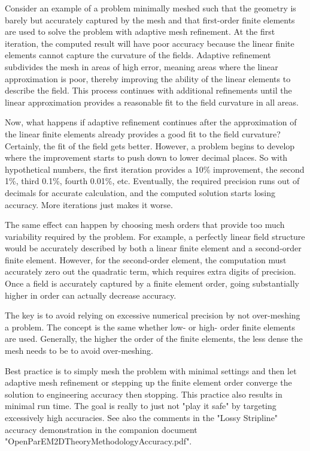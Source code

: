 \documentclass[titlepage]{article}
\renewcommand\_{\textunderscore\linebreak[1]}
\begin{document}
Consider an example of a problem minimally meshed such that the geometry is barely but accurately captured by the mesh and that first-order finite elements are used to solve the problem with adaptive mesh refinement.  At the first iteration, the computed result will have poor accuracy because the linear finite elements cannot capture the curvature of the fields.  Adaptive refinement subdivides the mesh in areas of high error, meaning areas where the linear approximation is poor, thereby improving the ability of the linear elements to describe the field.  This process continues with additional refinements until the linear approximation provides a reasonable fit to the field curvature in all areas.

Now, what happens if adaptive refinement continues after the approximation of the linear finite elements already provides a good fit to the field curvature?  Certainly, the fit of the field gets better.  However, a problem begins to develop where the improvement starts to push down to lower decimal places.  So with hypothetical numbers, the first iteration provides a 10\% improvement, the second 1\%, third 0.1\%, fourth 0.01\%, etc.  Eventually, the required precision runs out of decimals for accurate calculation, and the computed solution starts losing accuracy.  More iterations just makes it worse.

The same effect can happen by choosing mesh orders that provide too much variability required by the problem.  For example, a perfectly linear field structure would be accurately described by both a linear finite element and a second-order finite element.  However, for the second-order element, the computation must accurately zero out the quadratic term, which requires extra digits of precision.  Once a field is accurately captured by a finite element order, going substantially higher in order can actually decrease accuracy.

The key is to avoid relying on excessive numerical precision by not over-meshing a problem.  The concept is the same whether low- or high- order finite elements are used.  Generally, the higher the order of the finite elements, the less dense the mesh needs to be to avoid over-meshing.

Best practice is to simply mesh the problem with minimal settings and then let adaptive mesh refinement or stepping up the finite element order converge the solution to engineering accuracy then stopping. This practice also results in minimal run time.  The goal is really to just not "play it safe" by targeting excessively high accuracies.  See also the comments in the "Lossy Stripline" accuracy demonstration in the companion document "OpenParEM2D\_Theory\_Methodology\_Accuracy.pdf".
\end{document}
